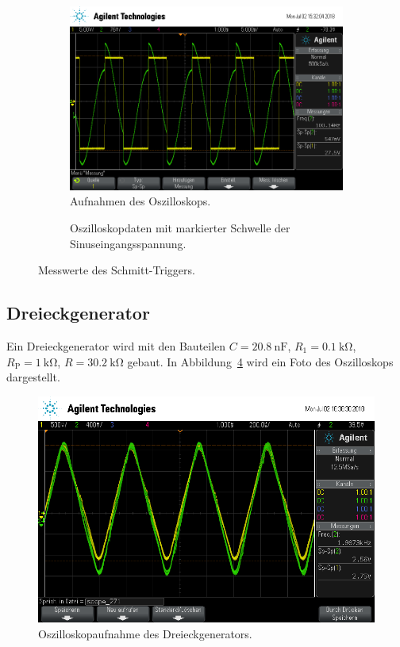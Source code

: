 \begin{figure}[ht]
  \centering
  \begin{subfigure}{\textwidth}
    \centering
    \includegraphics[height=0.3\textheight]{data/scope_268.png}
    \caption{Aufnahmen des Oszilloskops.}
    \label{fig:schmitt_osz}
  \end{subfigure}
  \begin{subfigure}{\textwidth}
    \centering
    
    \caption{Oszilloskopdaten mit markierter Schwelle der Sinuseingangsspannung.}
    \label{fig:schmitt_plot}
  \end{subfigure}
  \caption{Messwerte des Schmitt-Triggers.}
  \label{fig:schmitt}
\end{figure}

\subsection{Dreieckgenerator}
Ein Dreieckgenerator wird mit den Bauteilen
$C = \SI{20.8}{\nano\farad}$,
$R_1 = \SI{0.1}{\kilo\ohm}$,
$R_\text{P} = \SI{1}{\kilo\ohm}$,
$R = \SI{30.2}{\kilo\ohm}$
gebaut.
In Abbildung~\ref{fig:dreieck_generator} wird ein Foto des Oszilloskops dargestellt.
\begin{figure}[ht]
  \centering
  \includegraphics[height=0.3\textheight]{data/scope_271.png}
  \caption{Oszilloskopaufnahme des Dreieckgenerators.}
  \label{fig:dreieck_generator}
\end{figure}

